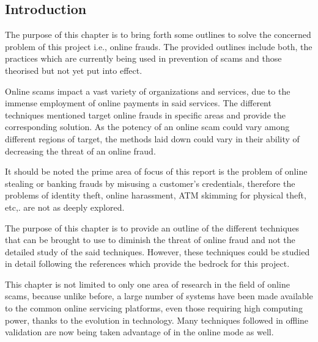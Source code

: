 \documentclass[12pt, oneside, a4paper]{article}
\begin{document}
\vspace{0.5cm}
\subsection{Introduction}
The purpose of this chapter is to bring forth some outlines to solve the concerned problem of this project i.e., online frauds. The provided outlines include both, the practices which are currently being used in prevention of scams and those theorised but not yet put into effect.

Online scams impact a vast variety of organizations and services, due to the immense employment of online payments in said services. The different techniques mentioned target online frauds in specific areas and provide the corresponding solution. As the potency of an online scam could vary among different regions of target, the methods laid down could vary in their ability of decreasing the threat of an online fraud.

It should be noted the prime area of focus of this report is the problem of online stealing or banking frauds by misusing a customer's credentials, therefore the problems of identity theft, online harassment, ATM skimming for physical theft, etc,. are not as deeply explored.

The purpose of this chapter is to provide an outline of the different techniques that can be brought to use to diminish the threat of online fraud and not the detailed study of the said techniques. However, these techniques could be studied in detail following the references which provide the bedrock for this project.

This chapter is not limited to only one area of research in the field of online scams, because unlike before, a large number of systems have been made available to the common online servicing platforms, even those requiring high computing power, thanks to the evolution in technology. Many techniques followed in offline validation are now being taken advantage of in the online mode as well.
\end{document}
